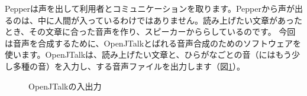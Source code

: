 Pepperは声を出して利用者とコミュニケーションを取ります。Pepperから声が出るのは、中に人間が入っているわけではありません。読み上げたい文章があったとき、その文章に合った音声を作り、スピーカーかららしているのです。
今回は音声を合成するために、OpenJTalkとばれる音声合成のためのソフトウェアを使います。OpenJTalkは、読み上げたい文章と、ひらがなごとの音（にはもう少し多種の音）を入力し、する音声ファイルを出力します（図\ref{OpenJTalkの入出力}）。

\begin{figure}[H]
\begin{center}
    
    \caption{OpenJTalkの入出力}
    \label{OpenJTalkの入出力}
\end{center}
\end{figure}

\begin{tcolorbox}[title=\useOmetoi]
\begin{enumerate}
\end{enumerate}
\end{tcolorbox}
